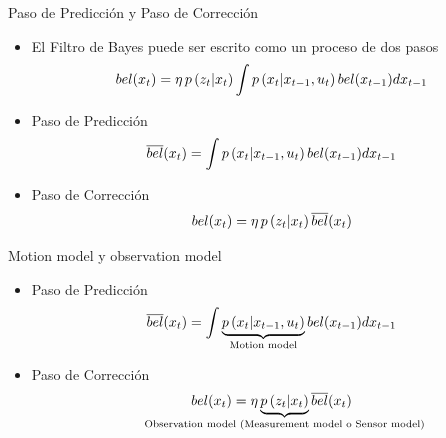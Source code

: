\begin{frame}{Paso de Predicción y Paso de Corrección}
    \begin{itemize}
        \item El Filtro de Bayes puede ser escrito como un proceso de dos pasos
        \begin{equation*}
        bel(x_{t}) = \eta \, p\left(z_{t} |x_{t} \right) \int p\left(x_{t} | x_{t-1}, u_{t} \right) bel(x_{t-1}) d x_{t-1}
        \end{equation*}
        \item Paso de Predicción
        \begin{equation*}
            \overline{bel}(x_{t}) = \int p\left(x_{t} | x_{t-1}, u_{t} \right) bel(x_{t-1}) d x_{t-1}
        \end{equation*}
        \item Paso de Corrección
        \begin{equation*}
            bel(x_{t}) = \eta \, p\left(z_{t} |x_{t} \right) \overline{bel}(x_{t})
        \end{equation*}
    \end{itemize}

    
\end{frame}

\begin{frame}{Motion model y observation model}
    \begin{itemize}
         \item Paso de Predicción
        \begin{equation*}
            \overline{bel}(x_{t}) = \int \underbrace{p\left(x_{t} | x_{t-1}, u_{t} \right)}_{\text{Motion model}} bel(x_{t-1}) d x_{t-1}
        \end{equation*}
        \item Paso de Corrección
        \begin{equation*}
            bel(\state_{t}) = \eta \underbrace{p\left(\observation_{t} |\state_{t} \right)}_{\text{\makebox[0pt]{Observation model (Measurement model o Sensor model)}}} \overline{bel}(\state_{t})
        \end{equation*}
    \end{itemize}
    
    
\end{frame}


